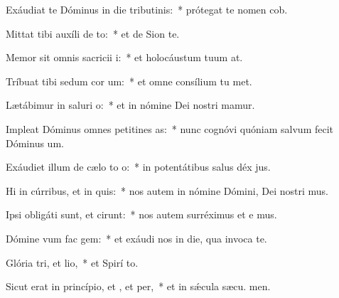 \item Exáudiat te Dóminus in die tributinis:~* prótegat te nomen  cob.
\item Mittat tibi auxíli de to:~* et de Sion  te.
\item Memor sit omnis sacricii i:~* et holocáustum tuum  at.
\item Tríbuat tibi sedum cor um:~* et omne consílium tu met.
\item Lætábimur in saluri o:~* et in nómine Dei nostri mamur.
\item Impleat Dóminus omnes petitines as:~* nunc cognóvi quóniam salvum fecit Dóminus  um.
\item Exáudiet illum de cælo to o:~* in potentátibus salus déx jus.
\item Hi in cúrribus, et  in quis:~* nos autem in nómine Dómini, Dei nostri mus.
\item Ipsi obligáti sunt, et cirunt:~* nos autem surréximus et e mus.
\item Dómine vum fac gem:~* et exáudi nos in die, qua invoca te.
\item Glória tri, et lio,~* et Spirí to.
\item Sicut erat in princípio, et , et per,~* et in sǽcula sæcu. men.
